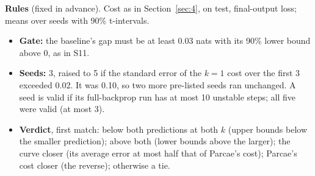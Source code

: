 \documentclass[10pt]{article}
\begin{document}
\textbf{Rules} (fixed in advance). Cost as in Section~\ref{sec:4}, on test, final-output loss; means over seeds with 90\% t-intervals.

\begin{itemize}
\item \textbf{Gate:} the baseline's gap must be at least 0.03 nats with its 90\% lower bound above 0, as in S11.
\item \textbf{Seeds:} 3, raised to 5 if the standard error of the $k = 1$ cost over the first 3 exceeded 0.02. It was 0.10, so two more pre-listed seeds ran unchanged. A seed is valid if its full-backprop run has at most 10 unstable steps; all five were valid (at most 3).
\item \textbf{Verdict}, first match: below both predictions at both $k$ (upper bounds below the smaller prediction); above both (lower bounds above the larger); the curve closer (its average error at most half that of Parcae's cost); Parcae's cost closer (the reverse); otherwise a tie.
\end{itemize}

\begin{table}[!htbp]
\centering\small
\caption{Ouro's test loss and training cost (final output; per seed, and mean with 90\% interval over 5 seeds).}
\label{tab:14}
\end{table}
\end{document}
